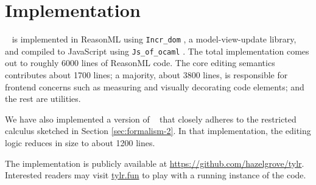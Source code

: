 \section{Implementation}\label{sec:implementation}

\tylr~ is implemented in ReasonML using \texttt{Incr\_dom} \cite{incr-dom},
a model-view-update library, and compiled to JavaScript using
\texttt{Js\_of\_ocaml} \cite{DBLP:conf/aplas/RadanneVB16}.
The total implementation comes out to roughly 6000 lines
of ReasonML code.
The core editing semantics contributes about 1700 lines;
a majority, about 3800 lines, is responsible for frontend
concerns such as measuring and visually decorating code
elements; and the rest are utilities.

We have also implemented a version of \tylr~ that closely adheres
to the restricted calculus sketched in Section \ref{sec:formalism-2}.
In that implementation, the editing logic reduces in size to
about 1200 lines.

The implementation is publicly available at
\url{https://github.com/hazelgrove/tylr}.
Interested readers may visit \url{tylr.fun} to play with a
running instance of the code.





